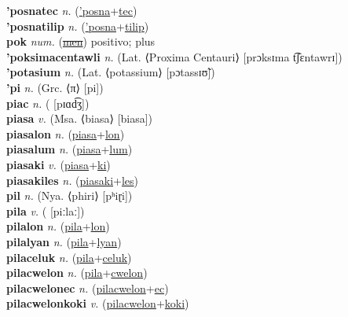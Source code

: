 \textbf{'posnatec} \textit{n.} (\hyperref['posna]{'posna}+\hyperref[tec]{tec})
 \label{'posnatec} \\
\textbf{'posnatilip} \textit{n.} (\hyperref['posna]{'posna}+\hyperref[tilip]{tilip})
 \label{'posnatilip} \\
\textbf{pok} \textit{num.} (\hyperref[men]{\sout{men}})
positivo; plus \label{pok} \\
\textbf{'poksimacentawli} \textit{n.} (Lat. ⟨Proxima Centauri⟩ [prɔksɪma t͡ʃɛntawrɪ])
 \label{'poksimacentawli} \\
\textbf{'potasium} \textit{n.} (Lat. ⟨potassium⟩ [pɔtassɪʊ̃])
 \label{'potasium} \\
\textbf{'pi} \textit{n.} (Grc. ⟨π⟩ [pi])
 \label{'pi} \\
\textbf{piac} \textit{n.} ( [pɪɑd͡ʒ])
 \label{piac} \\
\textbf{piasa} \textit{v.} (Msa. ⟨biasa⟩ [biasa])
 \label{piasa} \\
\textbf{piasalon} \textit{n.} (\hyperref[piasa]{piasa}+\hyperref[lon]{lon})
 \label{piasalon} \\
\textbf{piasalum} \textit{n.} (\hyperref[piasa]{piasa}+\hyperref[lum]{lum})
 \label{piasalum} \\
\textbf{piasaki} \textit{v.} (\hyperref[piasa]{piasa}+\hyperref[ki]{ki})
 \label{piasaki} \\
\textbf{piasakiles} \textit{n.} (\hyperref[piasaki]{piasaki}+\hyperref[les]{les})
 \label{piasakiles} \\
\textbf{pil} \textit{n.} (Nya. ⟨phiri⟩ [pʰiɽi])
 \label{pil} \\
\textbf{pila} \textit{v.} ( [piːlaː])
 \label{pila} \\
\textbf{pilalon} \textit{n.} (\hyperref[pila]{pila}+\hyperref[lon]{lon})
 \label{pilalon} \\
\textbf{pilalyan} \textit{n.} (\hyperref[pila]{pila}+\hyperref[lyan]{lyan})
 \label{pilalyan} \\
\textbf{pilaceluk} \textit{n.} (\hyperref[pila]{pila}+\hyperref[celuk]{celuk})
 \label{pilaceluk} \\
\textbf{pilacwelon} \textit{n.} (\hyperref[pila]{pila}+\hyperref[cwelon]{cwelon})
 \label{pilacwelon} \\
\textbf{pilacwelonec} \textit{n.} (\hyperref[pilacwelon]{pilacwelon}+\hyperref[ec]{ec})
 \label{pilacwelonec} \\
\textbf{pilacwelonkoki} \textit{v.} (\hyperref[pilacwelon]{pilacwelon}+\hyperref[koki]{koki})
 \label{pilacwelonkoki} \\
